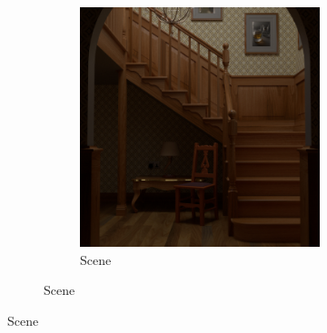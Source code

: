 \begin{figure}[]
    \centering    
    \begin{subfigure}{\textwidth}
        \centering
        \begin{subfigure}{0.5\textwidth}
            \centering
            \includegraphics[width=\textwidth]{images/04-experiment03/staircase_illum/scene_raw.jpg}
            \caption*{Scene}
        \end{subfigure}


\end{subfigure}
\end{figure}
